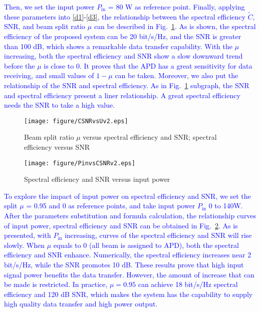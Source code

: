 \documentclass{IEEEtran}
\begin{document}
\textcolor{blue}{Then, we set the input power $P_\mathrm{in}$ = 80 W as reference point. Finally, applying these parameters into \eqref{d1}-\eqref{d3}, the relationship between the spectral efficiency $\widetilde{C}$, SNR, and beam split ratio $\mu$ can be described in Fig.~\ref{data4}. As is shown, the spectral efficiency of the proposed system can be 20 bit/s/Hz, and the SNR is greater than 100 dB, which shows a remarkable data transfer capability. 
With the $\mu$ increasing, both the spectral efficiency and SNR show a slow downward trend before the $\mu$ is close to 0. It proves that the APD has a great sensitivity for data receiving, and small values of $1-\mu$ can be taken. Moreover, we also put the relationship of the SNR and spectral efficiency. As in Fig.~\ref{data4} subgraph, the SNR and spectral efficiency present a liner relationship. A great spectral efficiency needs the SNR to take a 
high value. }
\begin{figure}[t]
	\centering
	\texttt{[image: figure/CSNRvsUv2.eps]}
	\caption{Beam split ratio $\mu$ versus spectral efficiency and SNR; spectral efficiency versus SNR}
	\label{data4}
\end{figure}
\begin{figure}[t]
	\centering
	\texttt{[image: figure/PinvsCSNRv2.eps]}
	\caption{Spectral efficiency and SNR versus input power }
	\label{data2}
\end{figure}

\textcolor{blue}{To explore the impact of input power on spectral efficiency and SNR, we set the split $\mu$ = 0.95 and 0 as reference points, and take input power $P_\mathrm{in}$ 0 to 140W. After the parameters substitution and formula calculation, the relationship curves of input power, spectral efficiency and SNR can be obtained in Fig.~\ref{data2}. As is presented, with $P_\mathrm{in}$ increasing, curves of the spectral efficiency and SNR will rise slowly.
When $\mu$ equals to 0 (all beam is assigned to APD), both the spectral efficiency and SNR enhance. Numerically, the spectral efficiency increases near 2 bit/s/Hz, while the SNR promotes 10 dB. 
These results prove that high input signal power benefits the data transfer. However, the amount of increase that can be made is restricted. In practice, $\mu = 0.95$ can achieve 18 bit/s/Hz spectral efficiency and 120 dB SNR, which makes the system has the capability to supply high quality data transfer and high power output.}
\end{document}

